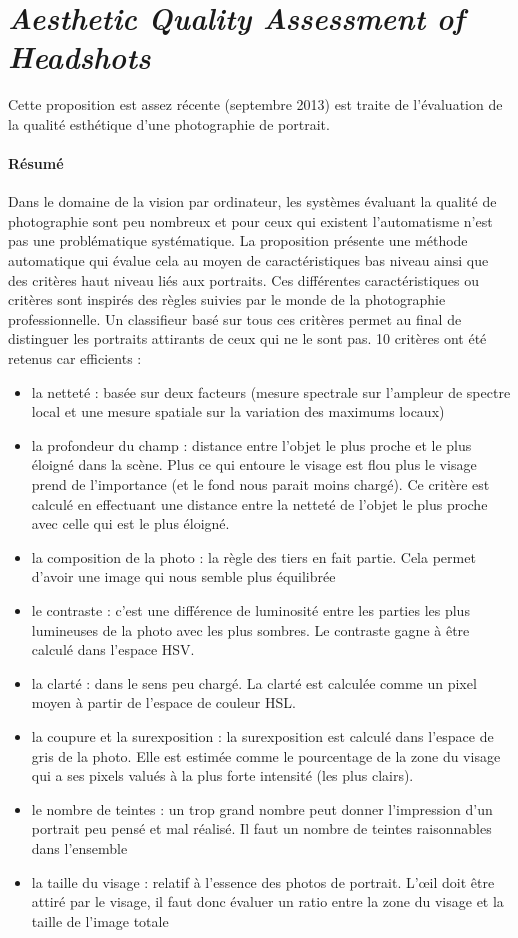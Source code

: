 \documentclass[11pt, french,screen]{report-rd-info}
\begin{document}
\section{\emph{Aesthetic Quality Assessment of Headshots}}
Cette proposition \cite{Males2013} est assez récente (septembre 2013) est traite de l’évaluation de la qualité esthétique d’une photographie de portrait.
\paragraph{Résumé}
Dans le domaine de la vision par ordinateur, les systèmes évaluant la qualité de photographie sont peu nombreux et pour ceux qui existent l’automatisme n’est pas une problématique systématique. La proposition présente une méthode automatique qui évalue cela au moyen de caractéristiques bas niveau ainsi que des critères haut niveau liés aux portraits. Ces différentes caractéristiques ou critères sont inspirés des règles suivies par le monde de la photographie professionnelle.
Un classifieur basé sur tous ces critères permet au final de distinguer les portraits attirants de ceux qui ne le sont pas. 10 critères ont été retenus car efficients :
\begin{itemize}
\item la netteté : basée sur deux facteurs (mesure spectrale sur l’ampleur de spectre local et une mesure spatiale sur la variation des maximums locaux)
\item la profondeur du champ : distance entre l’objet le plus proche et le plus éloigné dans la scène. Plus ce qui entoure le visage est flou plus le visage prend de l’importance (et le fond nous parait moins chargé). Ce critère est calculé en effectuant une distance entre la netteté de l’objet le plus proche avec celle qui est le plus éloigné.
\item la composition de la photo : la règle des tiers en fait partie. Cela permet d’avoir une image qui nous semble plus équilibrée
\item le contraste : c’est une différence de luminosité entre les parties les plus lumineuses de la photo avec les plus sombres. Le contraste gagne à être calculé dans l’espace HSV.
\item la clarté : dans le sens peu chargé. La clarté est calculée comme un pixel moyen à partir de l’espace de couleur HSL.
\item la coupure et la surexposition : la surexposition est calculé dans l’espace de gris de la photo. Elle est estimée comme le pourcentage de la zone du visage qui a ses pixels valués à la plus forte intensité (les plus clairs).
\item  le nombre de teintes : un trop grand nombre peut donner l’impression d’un portrait peu pensé et mal réalisé. Il faut un nombre de teintes raisonnables dans l’ensemble
\item la taille du visage : relatif à l’essence des photos de portrait. L’œil doit être attiré par le visage, il faut donc évaluer un ratio entre la zone du visage et la taille de l’image totale
\end{itemize}
\end{document}
